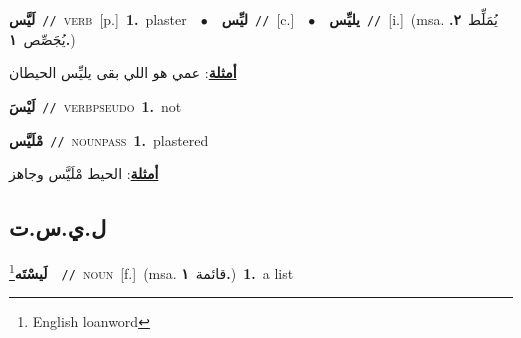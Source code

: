 \documentclass[10pt,a4paper,twoside]{article} %
\begin{document}
\begin{multicols}{2}
{\setlength\topsep{0pt}\textbf{\foreignlanguage{arabic}{لَيَّس}}\ {\color{gray}\texttt{//}\color{black}}\ \textsc{verb}\ [p.]\ \textbf{1.}~plaster\ \ $\bullet$\ \ \setlength\topsep{0pt}\textbf{\foreignlanguage{arabic}{ليِّس}}\ {\color{gray}\texttt{//}\color{black}}\ [c.]\ \ $\bullet$\ \ \setlength\topsep{0pt}\textbf{\foreignlanguage{arabic}{يليِّس}}\ {\color{gray}\texttt{//}\color{black}}\ [i.]\ \color{gray}(msa. \foreignlanguage{arabic}{يُمَلِّط}~\foreignlanguage{arabic}{\textbf{٢.}}  \foreignlanguage{arabic}{يُجَصِّص}~\foreignlanguage{arabic}{\textbf{١.}})\color{black}\  \begin{flushright}\color{gray}\foreignlanguage{arabic}{\textbf{\underline{\foreignlanguage{arabic}{أمثلة}}}: عمي هو اللي بقى يليِّس الحيطان}\end{flushright}\color{black}} \vspace{2mm}

{\setlength\topsep{0pt}\textbf{\foreignlanguage{arabic}{لَيْسَ}}\ {\color{gray}\texttt{//}\color{black}}\ \textsc{verb\textunderscore pseudo}\ \textbf{1.}~not\ } \vspace{2mm}

{\setlength\topsep{0pt}\textbf{\foreignlanguage{arabic}{مْلَيَّس}}\ {\color{gray}\texttt{//}\color{black}}\ \textsc{noun\textunderscore pass}\ \textbf{1.}~plastered\  \begin{flushright}\color{gray}\foreignlanguage{arabic}{\textbf{\underline{\foreignlanguage{arabic}{أمثلة}}}: الحيط مْلَيَّس وجاهز}\end{flushright}\color{black}} \vspace{2mm}

\vspace{-3mm}
\subsection*{\color{blue}\foreignlanguage{arabic}{ل.ي.س.ت}\color{blue}{ (ntws)}} 

{\setlength\topsep{0pt}\textbf{\foreignlanguage{arabic}{لَيسْتَه}}\footnote{English loanword}\ \ {\color{gray}\texttt{//}\color{black}}\ \textsc{noun}\ [f.]\ \color{gray}(msa. \foreignlanguage{arabic}{قائمة}~\foreignlanguage{arabic}{\textbf{١.}})\color{black}\ \textbf{1.}~a list\ } \vspace{2mm}


\end{multicols}
\end{document}
